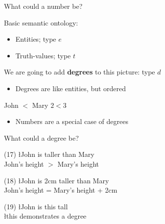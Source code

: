 \documentclass[pdf,12pt]{beamer}
\begin{document}
  \begin{frame}{What could a number be?}

    Basic semantic ontology: 
    \begin{itemize}
    \item Entities; type $e$
    \item Truth-values; type $t$
    \end{itemize}
\pause
\vfill
We are going to add {\bf degrees} to this picture: type $d$

\begin{itemize}
\item Degrees are like entities, but ordered
\end{itemize}
\vspace{-1ex}
\begin{center} John $<$ Mary \qquad $2 < 3$ \end{center}
\vspace{-1ex}
\begin{itemize}
\item Numbers are a special case of degrees
\end{itemize}
  
  \end{frame}

  \begin{frame}{What could a degree be?}

    (17) \l{John is taller than Mary} \pause \\
    John's height $>$ Mary's height
    
    \vfill \pause
    
    (18) \l{John is 2cm taller than Mary} \pause \\
    John's height = Mary's height + 2cm
 
 \vfill \pause
 
    (19) \l{John is this tall} \pause \\
    \l{this} demonstrates a degree

  \end{frame}
\end{document}
